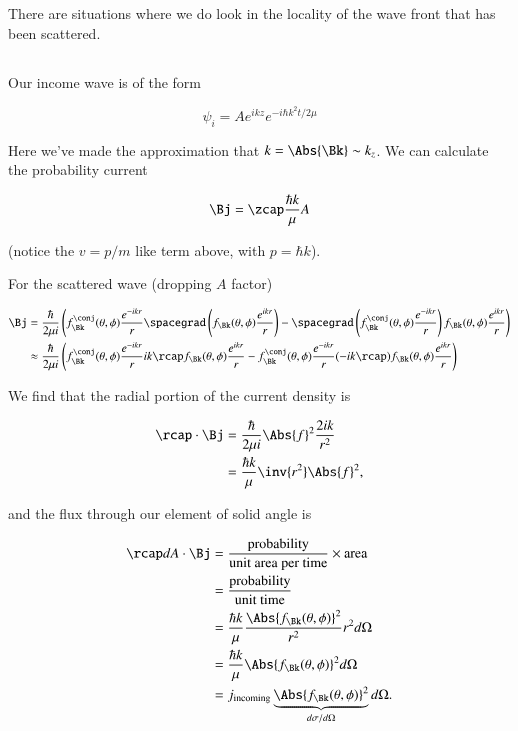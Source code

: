 There are situations where we do look in the locality of the wave front that has been scattered.

\subsection{}

Our income wave is of the form

\begin{equation}\label{eqn:qmTwoL24:210}
\psi_i = A e^{i k z} e^{-i \hbar k^2 t/2 \mu}
\end{equation}

Here we've made the approximation that $k = \Abs{\Bk} \sim k_z$.  We can calculate the probability current

\begin{equation}\label{eqn:qmTwoL24:230}
\Bj = \zcap \frac{\hbar k}{\mu} A
\end{equation}

(notice the $v = p/m$ like term above, with $p = \hbar k$).

For the scattered wave (dropping $A$ factor)

\begin{align*}
\Bj &=
\frac{\hbar}{2 \mu i}
\left(
f_\Bk^\conj(\theta, \phi) \frac{e^{-i k r}}{r} \spacegrad \left(
f_\Bk(\theta, \phi) \frac{e^{i k r}}{r}
\right)
-
\spacegrad \left(
f_\Bk^\conj(\theta, \phi) \frac{e^{-i k r}}{r}
\right)
f_\Bk(\theta, \phi) \frac{e^{i k r}}{r}
\right)
\\
&\approx
\frac{\hbar}{2 \mu i}
\left(
f_\Bk^\conj(\theta, \phi) \frac{e^{-i k r}}{r} i k \rcap f_\Bk(\theta, \phi)
\frac{e^{i k r}}{r}
-
f_\Bk^\conj(\theta, \phi) \frac{e^{-i k r}}{r} (-i k \rcap) f_\Bk(\theta, \phi)
\frac{e^{i k r}}{r}
\right)
\end{align*}

We find that the radial portion of the current density is

\begin{align*}
\rcap \cdot \Bj
&= \frac{\hbar}{2 \mu i} \Abs{f}^2 \frac{ 2 i k }{r^2} \\
&= \frac{\hbar k}{\mu} \inv{r^2} \Abs{f}^2,
\end{align*}

and the flux through our element of solid angle is

\begin{align*}
\rcap dA \cdot \Bj
&=
\frac{\text{probability}}{\text{unit area per time}} \times \text{area}  \\
&= \frac{\text{probability}}{\text{unit time}} \\
&=
\frac{\hbar k}{\mu} \frac{\Abs{f_\Bk(\theta, \phi)}^2}{r^2} r^2 d\Omega \\
&=
\frac{\hbar k }{\mu}
\Abs{f_\Bk(\theta, \phi)}^2 d\Omega \\
&=
j_{\text{incoming}}
\underbrace{\Abs{f_\Bk(\theta, \phi)}^2}_{d\sigma/d\Omega} d\Omega.
\end{align*}

